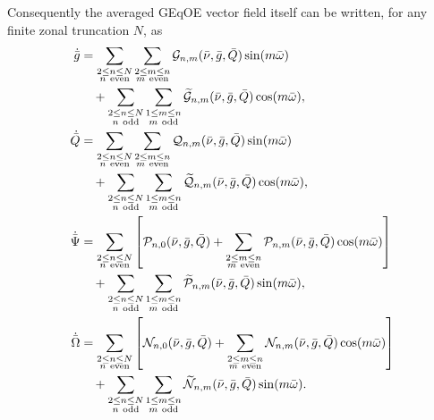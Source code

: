 \documentclass[11pt]{article}
\begin{document}
Consequently the averaged GEqOE vector field itself can be written, for any
finite zonal truncation $N$, as
\begin{align}
\dot{\bar g}
&=
\sum_{\substack{2\le n\le N\\ n\ \mathrm{even}}}
\sum_{\substack{2\le m\le n\\ m\ \mathrm{even}}}
\mathcal G_{n,m}(\bar\nu,\bar g,\bar Q)\sin(m\bar\omega)
\notag\\
&\quad+
\sum_{\substack{2\le n\le N\\ n\ \mathrm{odd}}}
\sum_{\substack{1\le m\le n\\ m\ \mathrm{odd}}}
\widetilde{\mathcal G}_{n,m}(\bar\nu,\bar g,\bar Q)\cos(m\bar\omega),
\label{eq:gdot_general_fourier}\\
\dot{\bar Q}
&=
\sum_{\substack{2\le n\le N\\ n\ \mathrm{even}}}
\sum_{\substack{2\le m\le n\\ m\ \mathrm{even}}}
\mathcal Q_{n,m}(\bar\nu,\bar g,\bar Q)\sin(m\bar\omega)
\notag\\
&\quad+
\sum_{\substack{2\le n\le N\\ n\ \mathrm{odd}}}
\sum_{\substack{1\le m\le n\\ m\ \mathrm{odd}}}
\widetilde{\mathcal Q}_{n,m}(\bar\nu,\bar g,\bar Q)\cos(m\bar\omega),
\label{eq:Qdot_general_fourier}\\
\dot{\bar\Psi}
&=
\sum_{\substack{2\le n\le N\\ n\ \mathrm{even}}}
\left[
\mathcal P_{n,0}(\bar\nu,\bar g,\bar Q)
+
\sum_{\substack{2\le m\le n\\ m\ \mathrm{even}}}
\mathcal P_{n,m}(\bar\nu,\bar g,\bar Q)\cos(m\bar\omega)
\right]
\notag\\
&\quad+
\sum_{\substack{2\le n\le N\\ n\ \mathrm{odd}}}
\sum_{\substack{1\le m\le n\\ m\ \mathrm{odd}}}
\widetilde{\mathcal P}_{n,m}(\bar\nu,\bar g,\bar Q)\sin(m\bar\omega),
\label{eq:Psidot_general_fourier}\\
\dot{\bar\Omega}
&=
\sum_{\substack{2\le n\le N\\ n\ \mathrm{even}}}
\left[
\mathcal N_{n,0}(\bar\nu,\bar g,\bar Q)
+
\sum_{\substack{2\le m\le n\\ m\ \mathrm{even}}}
\mathcal N_{n,m}(\bar\nu,\bar g,\bar Q)\cos(m\bar\omega)
\right]
\notag\\
&\quad+
\sum_{\substack{2\le n\le N\\ n\ \mathrm{odd}}}
\sum_{\substack{1\le m\le n\\ m\ \mathrm{odd}}}
\widetilde{\mathcal N}_{n,m}(\bar\nu,\bar g,\bar Q)\sin(m\bar\omega).
\label{eq:Omegadot_general_fourier}
\end{align}
\end{document}
